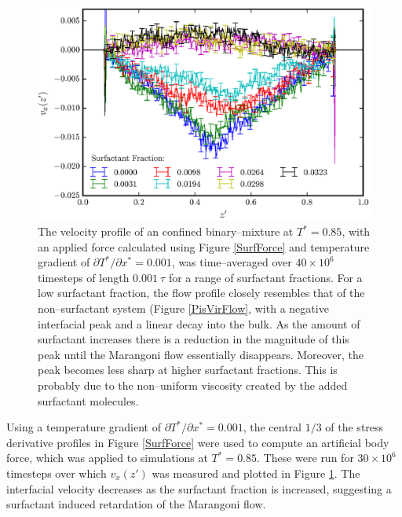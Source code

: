\begin{figure}[h!]
\centering
\includegraphics[scale=1.0]{SurfFlow}
\caption{The velocity profile of an confined binary--mixture at $T^{*}=0.85$, with an applied force calculated using Figure \ref{SurfForce} and temperature gradient of $\partial T^{*} / \partial x^{*} = 0.001$, was time--averaged over $40 \times 10^{6}$ timesteps of length $0.001\ \tau$ for a range of surfactant fractions.
For a low surfactant fraction, the flow profile closely resembles that of the non--surfactant system (Figure \ref{PisVirFlow}, with a negative interfacial peak and a linear decay into the bulk.
As the amount of surfactant increases there is a reduction in the magnitude of this peak until the Marangoni flow essentially disappears.
Moreover, the peak becomes less sharp at higher surfactant fractions.
This is probably due to the non--uniform viscosity created by the added surfactant molecules.
}
\label{SurfFlow}
\end{figure}
Using a temperature gradient of $\partial T^{*} / \partial x^{*} = 0.001$, the central $1/3$ of the stress derivative profiles in Figure \ref{SurfForce} were used to compute an artificial body force, which was applied to simulations at $T^{*}=0.85$.
These were run for $30 \times 10^{6}$ timesteps over which $v_{x}(z')$ was measured and plotted in Figure \ref{SurfFlow}.
The interfacial velocity decreases as the surfactant fraction is increased, suggesting a surfactant induced retardation of the Marangoni flow.

